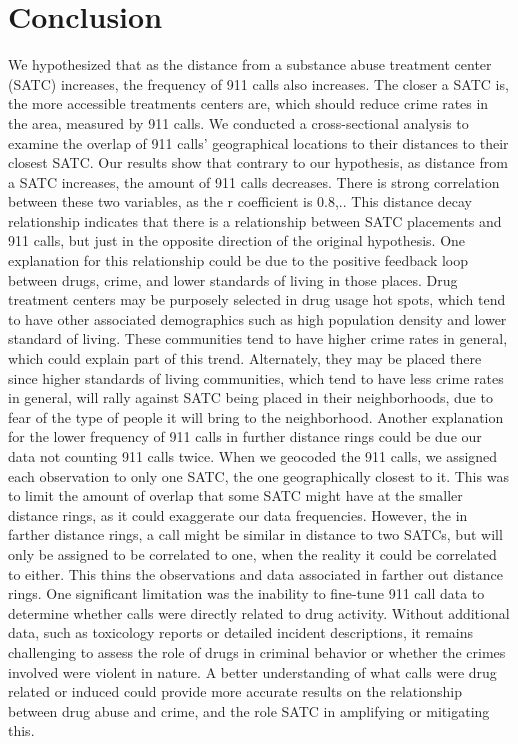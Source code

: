 \documentclass[12pt]{article}
\begin{document}
\section{Conclusion}
\label{sec:conclusion}

    We hypothesized that as the distance from a substance abuse treatment center (SATC) increases, the frequency of 911 calls also increases. The closer a SATC is, the more accessible treatments centers are, which should reduce crime rates in the area, measured by 911 calls. We conducted a cross-sectional analysis to examine the overlap of 911 calls' geographical locations to their distances to their closest SATC. Our results show that contrary to our hypothesis, as distance from a SATC increases, the amount of 911 calls decreases. There is strong correlation between these two variables, as the r coefficient is 0.8,.. This distance decay relationship indicates that there is a relationship between SATC placements and 911 calls, but just in the opposite direction of the original hypothesis. 
    One explanation for this relationship could be due to the positive feedback loop between drugs, crime, and lower standards of living in those places. Drug treatment centers may be purposely selected in drug usage hot spots, which tend to have other associated demographics such as high population density and lower standard of living. These communities tend to have higher crime rates in general, which could explain part of this trend. Alternately, they may be placed there since higher standards of living communities, which tend to have less crime rates in general, will rally against SATC being placed in their neighborhoods, due to fear of the type of people it will bring to the neighborhood. 
    Another explanation for the lower frequency of 911 calls in further distance rings could be due our data not counting 911 calls twice. When we geocoded the 911 calls, we assigned each observation to only one SATC, the one geographically closest to it. This was to limit the amount of overlap that some SATC might have at the smaller distance rings, as it could exaggerate our data frequencies. However, the in farther distance rings, a call might be similar in distance to two SATCs, but will only be assigned to be correlated to one, when the reality it could be correlated to either. This thins the observations and data associated in farther out distance rings. 
    One significant limitation was the inability to fine-tune 911 call data to determine whether calls were directly related to drug activity. Without additional data, such as toxicology reports or detailed incident descriptions, it remains challenging to assess the role of drugs in criminal behavior or whether the crimes involved were violent in nature. A better understanding of what calls were drug related or induced could provide more accurate results on the relationship between drug abuse and crime, and the role SATC in amplifying or mitigating this. 
\end{document}
